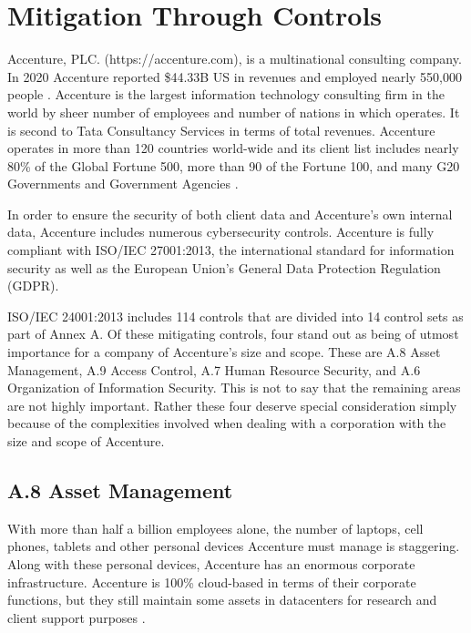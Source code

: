 \section{Mitigation Through Controls}

Accenture, PLC. (https://accenture.com), is a multinational consulting company. In 2020 Accenture reported \$44.33B US in revenues and employed nearly 550,000 people \parencite{accentureplcAccenture2020Annual2020}. Accenture is the largest information technology consulting firm in the world by sheer number of employees and number of nations in which operates. It is second to Tata Consultancy Services in terms of total revenues. Accenture operates in more than 120 countries world-wide and its client list includes nearly 80\% of the Global Fortune 500, more than 90 of the Fortune 100, and many G20 Governments and Government Agencies \parencite{wagleClientAnalysisAccenture2020,accentureplcAccenture2020Annual2020}.

In order to ensure the security of both client data and Accenture's own internal data, Accenture includes numerous cybersecurity controls. Accenture is fully compliant with ISO/IEC 27001:2013, the international standard for information security \parencite{accentureInformationSecurityClient2021} as well as the European Union's General Data Protection Regulation (GDPR).

ISO/IEC 24001:2013 includes 114 controls that are divided into 14 control sets as part of Annex A. Of these mitigating controls, four stand out as being of utmost importance for a company of Accenture's size and scope. These are A.8 Asset Management, A.9 Access Control, A.7 Human Resource Security, and A.6 Organization of Information Security. This is not to say that the remaining areas are not highly important. Rather these four deserve special consideration simply because of the complexities involved when dealing with a corporation with the size and scope of Accenture.

\subsection{A.8 Asset Management}

With more than half a billion employees alone, the number of laptops, cell phones, tablets and other personal devices Accenture must manage is staggering. Along with these personal devices, Accenture has an enormous corporate infrastructure. Accenture is 100\% cloud-based in terms of their corporate functions, but they still maintain some assets in datacenters for research and client support purposes \parencite{AccentureCloudFirst2020,accentureplcAccenture2020Annual2020}.

